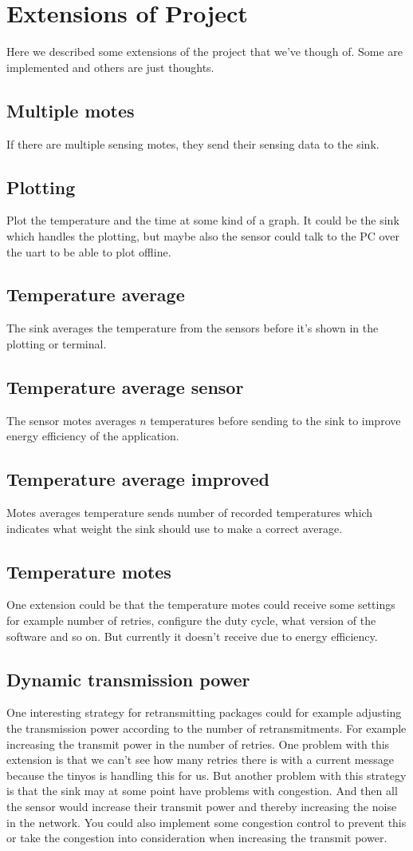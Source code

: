 \section{Extensions of Project}
Here we described some extensions of the project that we've though of. Some are implemented and others are just thoughts.
\subsection{Multiple motes}
 If there are multiple sensing motes, they send their sensing data to the sink.
\subsection{Plotting} Plot the temperature and the time at some kind of a graph. It could be the sink which handles the plotting, but maybe also the sensor could talk to the PC over the uart to be able to plot offline.
\subsection{Temperature average} The sink averages the temperature from the sensors before it's shown in the plotting or terminal.
\subsection{Temperature average sensor} The sensor motes averages $n$ temperatures before sending to the sink to improve energy efficiency of the application.
\subsection{Temperature average improved} Motes averages temperature sends number of recorded temperatures which indicates what weight the sink should use to make a correct average.
\subsection{Temperature motes} One extension could be that the temperature motes could receive some settings for example number of retries, configure the duty cycle, what version of the software and so on. But currently it doesn't receive due to energy efficiency. 
\subsection{Dynamic transmission power} One interesting strategy for retransmitting packages could for example adjusting the transmission power according to the number of retransmitments. For example increasing the transmit power in the number of retries. One problem with this extension is that we can't see how many retries there is with a current message because the tinyos is handling this for us. But another problem with this strategy is that the sink may at some point have problems with congestion. And then all the sensor would increase their transmit power and thereby increasing the noise in the network. You could also implement some congestion control to prevent this or take the congestion into consideration when increasing the transmit power.

